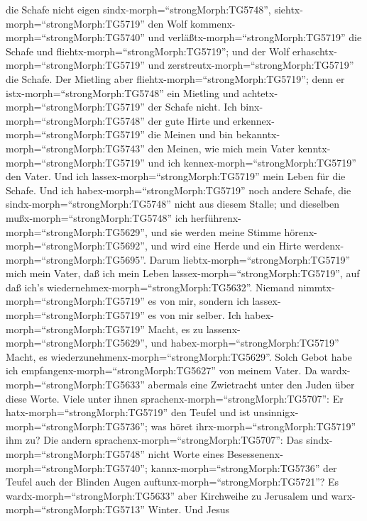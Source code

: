 die Schafe nicht eigen sindx-morph=``strongMorph:TG5748'',
siehtx-morph=``strongMorph:TG5719'' den Wolf
kommenx-morph=``strongMorph:TG5740'' und
verläßtx-morph=``strongMorph:TG5719'' die Schafe und
fliehtx-morph=``strongMorph:TG5719''; und der Wolf
erhaschtx-morph=``strongMorph:TG5719'' und
zerstreutx-morph=``strongMorph:TG5719'' die Schafe.  Der
Mietling aber fliehtx-morph=``strongMorph:TG5719''; denn er
istx-morph=``strongMorph:TG5748'' ein Mietling und
achtetx-morph=``strongMorph:TG5719'' der Schafe nicht.  Ich
binx-morph=``strongMorph:TG5748'' der gute Hirte und
erkennex-morph=``strongMorph:TG5719'' die Meinen und bin
bekanntx-morph=``strongMorph:TG5743'' den Meinen,  wie mich
mein Vater kenntx-morph=``strongMorph:TG5719'' und ich
kennex-morph=``strongMorph:TG5719'' den Vater. Und ich
lassex-morph=``strongMorph:TG5719'' mein Leben für die Schafe.
 Und ich habex-morph=``strongMorph:TG5719'' noch andere
Schafe, die sindx-morph=``strongMorph:TG5748'' nicht aus diesem Stalle;
und dieselben mußx-morph=``strongMorph:TG5748'' ich
herführenx-morph=``strongMorph:TG5629'', und sie werden meine Stimme
hörenx-morph=``strongMorph:TG5692'', und wird eine Herde und ein Hirte
werdenx-morph=``strongMorph:TG5695''.  Darum
liebtx-morph=``strongMorph:TG5719'' mich mein Vater, daß ich mein Leben
lassex-morph=``strongMorph:TG5719'', auf daß ich's
wiedernehmex-morph=``strongMorph:TG5632''.  Niemand
nimmtx-morph=``strongMorph:TG5719'' es von mir, sondern ich
lassex-morph=``strongMorph:TG5719'' es von mir selber. Ich
habex-morph=``strongMorph:TG5719'' Macht, es zu
lassenx-morph=``strongMorph:TG5629'', und
habex-morph=``strongMorph:TG5719'' Macht, es
wiederzunehmenx-morph=``strongMorph:TG5629''. Solch Gebot habe ich
empfangenx-morph=``strongMorph:TG5627'' von meinem Vater. 
Da wardx-morph=``strongMorph:TG5633'' abermals eine Zwietracht unter den
Juden über diese Worte.  Viele unter ihnen
sprachenx-morph=``strongMorph:TG5707'': Er
hatx-morph=``strongMorph:TG5719'' den Teufel und ist
unsinnigx-morph=``strongMorph:TG5736''; was höret
ihrx-morph=``strongMorph:TG5719'' ihm zu?  Die andern
sprachenx-morph=``strongMorph:TG5707'': Das
sindx-morph=``strongMorph:TG5748'' nicht Worte eines
Besessenenx-morph=``strongMorph:TG5740'';
kannx-morph=``strongMorph:TG5736'' der Teufel auch der Blinden Augen
auftunx-morph=``strongMorph:TG5721''?  Es
wardx-morph=``strongMorph:TG5633'' aber Kirchweihe zu Jerusalem und
warx-morph=``strongMorph:TG5713'' Winter.  Und Jesus
